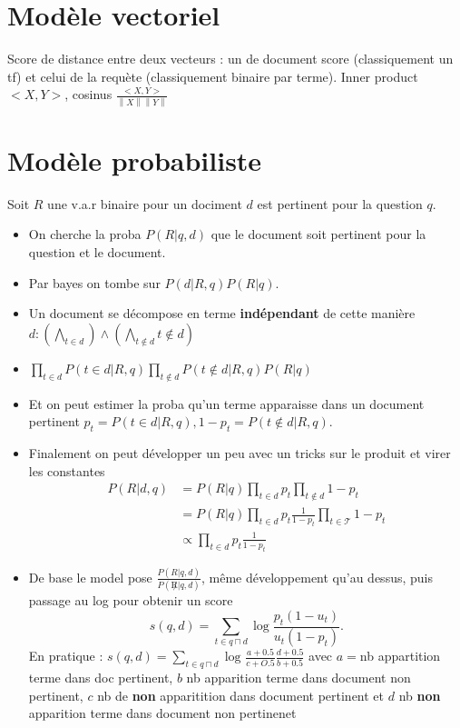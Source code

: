 \documentclass{article}
\theoremstyle{plain}%
\theoremstyle{definition}
\theoremstyle{remark}
\begin{document}
\section{Modèle vectoriel}
Score de distance entre deux vecteurs : un de document score (classiquement un tf) et celui de la requète (classiquement binaire par terme). Inner product $ <X,Y> $, cosinus $ \frac{<X,Y>}{\left\| X \right\| \left\| Y \right\| } $ 

\section{Modèle probabiliste}
Soit $ R $ une v.a.r binaire pour un dociment $ d $ est pertinent pour la question $ q $. 
\begin{itemize}
    \item On cherche la proba $ P(R | q,d) $ que le document soit pertinent pour la question et le document.
    \item Par bayes on tombe sur $ P(d | R, q) P(R | q ) $.
    \item Un document se décompose en terme \textbf{indépendant} de cette manière  $d : (\bigwedge_{t \in d} ) \wedge (\bigwedge_{t \not \in d} t \not \in d)$
    \item $ \prod_{t \in d}^{} P(t \in d | R, q) \prod_{t \not\in d} P(t \not \in d | R, q) P( R | q) $
    \item Et on peut estimer la proba qu'un terme apparaisse dans un document pertinent $ p_t = P(t \in d | R, q), 1 - p_t = P(t \not\in d | R, q) $. 
    \item Finalement on peut développer un peu avec un tricks sur le produit et virer les constantes\begin{align*}
        P(R | d,q) &= P(R|q) \prod_{t \in d} p_t \prod_{t \not\in d} 1 - p_t \\
                &= P(R | q) \prod_{t \in d}^{} p_t \frac{1}{1 - p_t} \prod_{t \in \mathcal{T}}^{} 1 - p_t \\ 
                &\propto \prod_{t \in d}^{} p_t \frac{1}{1 - p_t}
    \end{align*}
    \item De base le model pose $ \frac{P(R | q, d)}{P(\not R | q, d)} $, même développement qu'au dessus, puis passage au log pour obtenir un score 
    \[
        s(q,d) = \sum_{t \in q \sqcap d}^{} \log \frac{p_t (1 - u_t)}{u_t (1 - p_t)}
    .\]
    En pratique : $ s(q,d) = \sum_{t \in q \sqcap d}^{} \log_{} \frac{a + 0.5}{c + O.5} \frac{d + 0.5}{b+0.5} $ avec $a=$nb appartition terme dans doc pertinent, $b$ nb apparition terme dans document non pertinent, $c$ nb de \textbf{non} apparitition dans document pertinent et $d$ nb \textbf{non} apparition terme dans document non pertinenet

\end{itemize}
\end{document}
